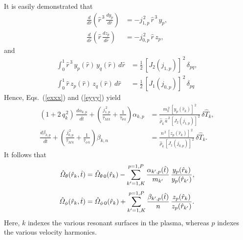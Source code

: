 \documentclass[12pt]{article}
\begin{document}
It is easily demonstrated that
\begin{align}
\frac{d}{d\hat{r}}\!\left(\hat{r}^{\,3}\,\frac{dy_p}{d\hat{r}}\right)& = - j_{1,p}^{\,2}\,\hat{r}^{\,3}\,y_p,\\[0.5ex]
\frac{d}{d\hat{r}}\!\left(\hat{r}\,\frac{dz_p}{d\hat{r}}\right) &= - j_{0,p}^{\,2}\,\hat{r}\,z_p,
\end{align}
and
\begin{align}
\int_0^{1}\hat{r}^{\,3}\,y_p(\hat{r})\,y_q(\hat{r})\,d\hat{r}& = \frac{1}{2}\,\left[J_2(j_{1,p})\right]^{\,2}\,\delta_{pq},\\[0.5ex]
\int_0^1\hat{r}\,z_p(\hat{r})\,z_q(\hat{r})\,d\hat{r}& = \frac{1}{2}\,\left[J_1(j_{0,p})\right]^{\,2}\,\delta_{pq}\label{e162}
\end{align}
Hence, Eqs.~(\ref{exxx}) and (\ref{eyyy}) yield
\begin{align}
(1+2\,q_k^{\,2})\,\frac{d\alpha_{k,p}}{d\hat{t}}
+\left(\frac{j_{1,p}^{\,2}}{\hat{\tau}_{M\,k}} + \frac{1}{\hat{\tau}_{\theta\,k}}\right)\alpha_{k,p}&=
\frac{m_k^{\,2}\,[y_p(\hat{r}_k)]^{\,2}}{\hat{\rho}_k\,\hat{a}^{\,2}\,
[J_2(j_{1,p})]^{\,2}}\,\delta \hat{T}_k,\\[0.5ex]
\frac{d\beta_{k,p}}{d\hat{t}}
+\left(\frac{j_{0,p}^{\,2}}{\hat{\tau}_{M\,k}} + \frac{1}{\hat{\tau}_{\phi\,k}}\right)\beta_{k,n}&=
\frac{n^{\,2}\,[z_p(\hat{r}_k)]^{\,2}}{\hat{\rho}_k\,
[J_1(j_{0,p})]^{\,2}}\,\delta \hat{T}_k.
\end{align}
It follows that
\begin{align}\label{errr}
\hat{\mit\Omega}_\theta(\hat{r}_k,\hat{t}) &=
\hat{\mit\Omega}_{\theta\,0}(\hat{r}_k) - \sum_{k'=1,K}^{p=1,P} \frac{\alpha_{k',p}(\hat{t})}{m_{k'}}\,\frac{y_p(\hat{r}_k)}{y_p(\hat{r}_{k'})},\\[0.5ex]
\hat{\mit\Omega}_\phi(\hat{r}_k,\hat{t}) &=
\hat{\mit\Omega}_{\phi\,0}(\hat{r}_k) + \sum_{k'=1,K}^{p=1,P} \frac{\beta_{k',p}(\hat{t})}{n}\,\frac{z_p(\hat{r}_k)}{z_p(\hat{r}_{k'})}.\label{errt}
\end{align}
Here, $k$ indexes the various resonant surfaces in the plasma,
whereas $p$  indexes the various
velocity harmonics. 
\end{document}
